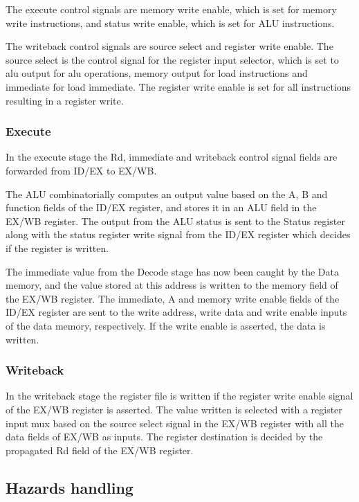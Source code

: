 \documentclass[11pt]{report}
\begin{document}
The execute control signals are memory write enable, which is set for memory write instructions,
and status write enable, which is set for ALU instructions.

The writeback control signals are source select and register write enable. 
The source select is the control signal for the register input selector,
which is set to alu output for alu operations, memory output 
for load instructions and immediate for load immediate. 
The register write enable is set for all instructions resulting in a register write.

\subsubsection*{Execute}

In the execute stage the Rd, immediate and writeback control signal fields are 
forwarded from ID/EX to EX/WB. 

The ALU combinatorially computes an output value based on
the A, B and function fields of the ID/EX register, and stores it in an ALU field in
the EX/WB register. The output from the ALU status is sent to the Status register along
with the status register write signal from the ID/EX register which decides if the 
register is written.

The immediate value from the Decode stage has now been caught 
by the Data memory, and the value stored at this address is written to the memory field
of the EX/WB register. The immediate, A and memory write enable fields of the ID/EX register
are sent to the write address, write data and write enable inputs of the data memory,
respectively. If the write enable is asserted, the data is written.

\subsubsection*{Writeback}

In the writeback stage the register file is written if the register write enable
signal of the EX/WB register is asserted. The value written is selected with a register
input mux based on the source select signal in the EX/WB register with all the data fields
of EX/WB as inputs. The register destination is decided by the propagated Rd field of the
EX/WB register.



\subsection*{Hazards handling}
\end{document}
